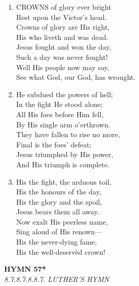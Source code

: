 \documentclass[11pt,a4paper]{article}
\begin{document}
\begin{enumerate}
    \item CROWNS of glory ever bright \\
        Rest upon the Victor's head. \\
        Crowns of glory are His right, \\
        His who liveth and was dead. \\
        Jesus fought and won the day, \\
        Such a day was never fought! \\
        Well His people now may say, \\
        See what God, our God, has wrought.

    \item He subdued the powers of hell; \\
        In the fight He stood alone; \\
        All His foes before Him fell, \\
        By His single arm o'erthrown. \\
        They have fallen to rise no more, \\
        Final is the foes' defeat; \\
        Jesus triumphed by His power, \\
        And His triumph is complete.

    \item His the fight, the arduous toil, \\
        His the honours of the day, \\
        His the glory and the spoil, \\
        Jesus bears them all away. \\
        Now exalt His peerless name, \\
        Sing aloud of His renown--- \\
        His the never-dying fame, \\
        His the well-deserv\`ed crown!

\end{enumerate}

\newpage
\begin{center}
    {\Large \textbf{HYMN 57*}}
    \\
    \textit{8.7.8.7.8.8.7. LUTHER'S HYMN}
\end{center}
\vspace{1em}
\end{document}
